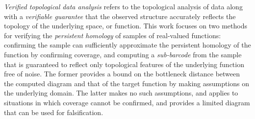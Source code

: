 
\emph{Verified topological data analysis} refers to the topological analysis of data along with a \emph{verifiable guarantee} that the observed structure accurately reflects the topology of the underlying space, or function.
This work focuses on two methods for verifying the \emph{persistent homology} of samples of real-valued functions: confirming the sample can sufficiently approximate the persistent homology of the function by confirming coverage, and computing a \emph{sub-barcode} from the sample that is guaranteed to reflect only topological features of the underlying function free of noise.
The former provides a bound on the bottleneck distance between the computed diagram and that of the target function by making assumptions on the underlying domain.
The latter makes no such assumptions, and applies to situations in which coverage cannot be confirmed, and provides a limited diagram that can be used for falsification.
